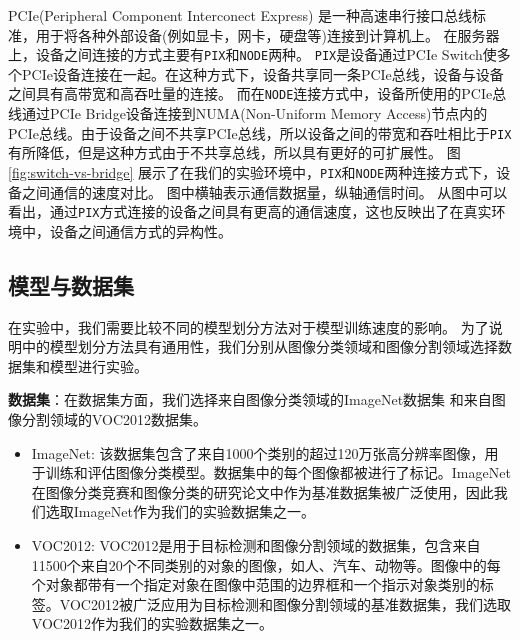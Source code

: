 PCIe(Peripheral Component Interconect Express) 是一种高速串行接口总线标准，用于将各种外部设备(例如显卡，网卡，硬盘等)连接到计算机上。
在服务器上，设备之间连接的方式主要有\texttt{PIX}和\texttt{NODE}两种。
\texttt{PIX}是设备通过PCIe Switch使多个PCIe设备连接在一起。在这种方式下，设备共享同一条PCIe总线，设备与设备之间具有高带宽和高吞吐量的连接。
而在\texttt{NODE}连接方式中，设备所使用的PCIe总线通过PCIe Bridge设备连接到NUMA(Non-Uniform Memory Access)节点内的PCIe总线。由于设备之间不共享PCIe总线，所以设备之间的带宽和吞吐相比于\texttt{PIX}有所降低，但是这种方式由于不共享总线，所以具有更好的可扩展性。
图\ref{fig:switch-vs-bridge} 展示了在我们的实验环境中，\texttt{PIX}和\texttt{NODE}两种连接方式下，设备之间通信的速度对比。
图中横轴表示通信数据量，纵轴通信时间。
从图中可以看出，通过\texttt{PIX}方式连接的设备之间具有更高的通信速度，这也反映出了在真实环境中，设备之间通信方式的异构性。


\subsection{模型与数据集}
在实验中，我们需要比较不同的模型划分方法对于模型训练速度的影响。
为了说明\sys{}中的模型划分方法具有通用性，我们分别从图像分类领域和图像分割领域选择数据集和模型进行实验。

\noindent\textbf{数据集}：在数据集方面，我们选择来自图像分类领域的ImageNet数据集 和来自图像分割领域的VOC2012数据集。
\begin{itemize}
	\item ImageNet: 该数据集包含了来自1000个类别的超过120万张高分辨率图像，用于训练和评估图像分类模型。数据集中的每个图像都被进行了标记。ImageNet在图像分类竞赛和图像分类的研究论文中作为基准数据集被广泛使用，因此我们选取ImageNet作为我们的实验数据集之一。
	\item VOC2012: VOC2012是用于目标检测和图像分割领域的数据集，包含来自11500个来自20个不同类别的对象的图像，如人、汽车、动物等。图像中的每个对象都带有一个指定对象在图像中范围的边界框和一个指示对象类别的标签。VOC2012被广泛应用为目标检测和图像分割领域的基准数据集，我们选取VOC2012作为我们的实验数据集之一。
\end{itemize}

